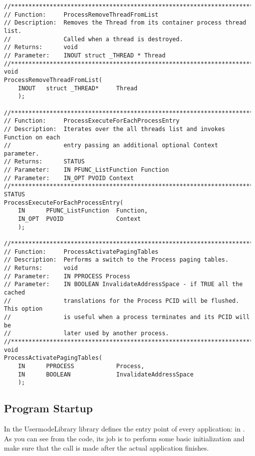 \begin{appendices}
\begin{lstlisting}[caption={Process Private Interface},label={lst:ProcPrivate}]
//******************************************************************************
// Function:     ProcessRemoveThreadFromList
// Description:  Removes the Thread from its container process thread list.
//               Called when a thread is destroyed.
// Returns:      void
// Parameter:    INOUT struct _THREAD * Thread
//******************************************************************************
void
ProcessRemoveThreadFromList(
    INOUT   struct _THREAD*     Thread
    );

//******************************************************************************
// Function:     ProcessExecuteForEachProcessEntry
// Description:  Iterates over the all threads list and invokes Function on each
//               entry passing an additional optional Context parameter.
// Returns:      STATUS
// Parameter:    IN PFUNC_ListFunction Function
// Parameter:    IN_OPT PVOID Context
//******************************************************************************
STATUS
ProcessExecuteForEachProcessEntry(
    IN      PFUNC_ListFunction  Function,
    IN_OPT  PVOID               Context
    );

//******************************************************************************
// Function:     ProcessActivatePagingTables
// Description:  Performs a switch to the Process paging tables.
// Returns:      void
// Parameter:    IN PPROCESS Process
// Parameter:    IN BOOLEAN InvalidateAddressSpace - if TRUE all the cached
//               translations for the Process PCID will be flushed. This option
//               is useful when a process terminates and its PCID will be
//               later used by another process.
//******************************************************************************
void
ProcessActivatePagingTables(
    IN      PPROCESS            Process,
    IN      BOOLEAN             InvalidateAddressSpace
    );
\end{lstlisting}

\subsection{Program Startup}
\label{sect:ProgramStart}

In \projectname the UsermodeLibrary library defines the entry point of every application:
 in . As you can see from the code, its job is to perform some basic
initialization and make sure that the  call is made after the actual
application finishes.


\end{appendices}
